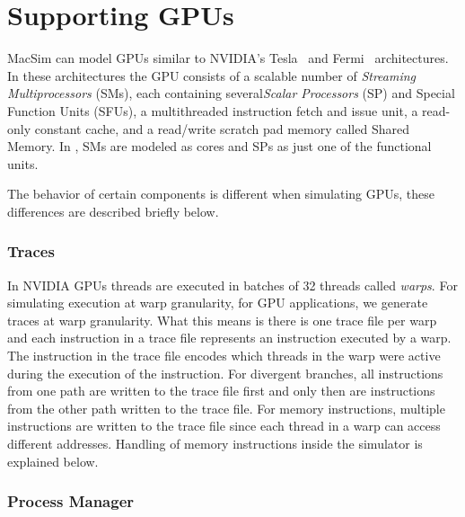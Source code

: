 
\chapter{Supporting GPUs}

MacSim can model GPUs similar to NVIDIA's Tesla~\cite{lin:nic08} and
Fermi~\cite{fermi} architectures.  In these architectures the GPU consists of a
scalable number of {\em Streaming Multiprocessors} (SMs), each containing
several{\em Scalar Processors} (SP) and Special Function Units (SFUs), a
multithreaded instruction fetch and issue unit, a read-only constant cache, and
a read/write scratch pad memory called Shared Memory.  In \SIM, SMs are modeled
as cores and SPs as just one of the functional units. 



The behavior of certain components is different when simulating GPUs, these
differences are described briefly below.

\subsection{Traces}
\label{sec:ptx_traces}

In NVIDIA GPUs threads are executed in batches of 32 threads called
\textit{warps}. For simulating execution at warp granularity, for GPU
applications, we generate traces at warp granularity. What this means is there
is one trace file per warp and each instruction in a trace file represents an
instruction executed by a warp. The instruction in the trace file encodes which
threads in the warp were active during the execution of the instruction. For
divergent branches, all instructions from one path are written to the trace
file first and only then are instructions from the other path written to the
trace file. For memory instructions, multiple instructions are written to the
trace file since each thread in a warp can access different addresses. Handling
of memory instructions inside the simulator is explained below.

\subsection{Process Manager}

